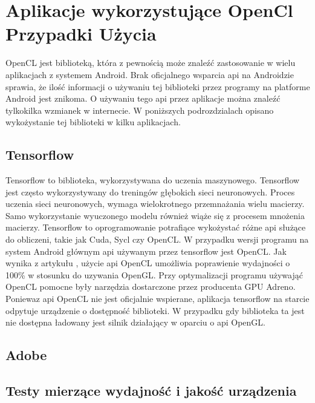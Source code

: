 \section[Aplikacje wykorzystujące OpenCl Przypadki Użycia]{Aplikacje wykorzystujące OpenCl Przypadki Użycia}
OpenCL jest biblioteką, która z pewnością może znaleźć zastosowanie w wielu aplikacjach z systemem Android. Brak oficjalnego wsparcia api na Androidzie sprawia, że ilość informacji o używaniu tej biblioteki przez programy na platforme Android jest znikoma. O używaniu tego api przez aplikacje można znaleźć tylkokilka wzmianek w internecie. W poniższych podrozdzialach opisano wykożystanie tej biblioteki w kilku aplikacjach.
\subsection[Tensorflow]{Tensorflow}
Tensorflow to biblioteka, wykorzystywana do uczenia maszynowego. Tensorflow jest często wykorzystywany do treningów głębokich sieci neuronowych. Proces uczenia sieci neuronowych, wymaga wielokrotnego przemnażania wielu macierzy. Samo wykorzystanie wyuczonego modelu również wiąże się z procesem mnożenia macierzy. Tensorflow to oprogramowanie potrafiące wykożystać różne api służące do obliczeni, takie jak Cuda, Sycl czy OpenCL. W przypadku wersji programu na system Android głównym api używanym przez tensorflow jest OpenCL. Jak wynika z artykułu \cite{Tensor}, użycie api OpenCL umożliwia poprawienie wydajności o 100\% w stosunku do uzywania OpenGL. Przy optymalizacji programu używająć OpenCL pomocne były narzędzia dostarczone przez producenta GPU Adreno. Poniewaz api OpenCL nie jest oficjalnie wspierane, aplikacja tensorflow na starcie odpytuje urządzenie o dostępność biblioteki. W przypadku gdy biblioteka ta jest nie dostępna ładowany jest silnik działający w oparciu o api OpenGL.
\subsection[Adobe]{Adobe}
\subsection[Testy mierzące wydajność i jakość urządzenia]{Testy mierzące wydajność i jakość urządzenia}

